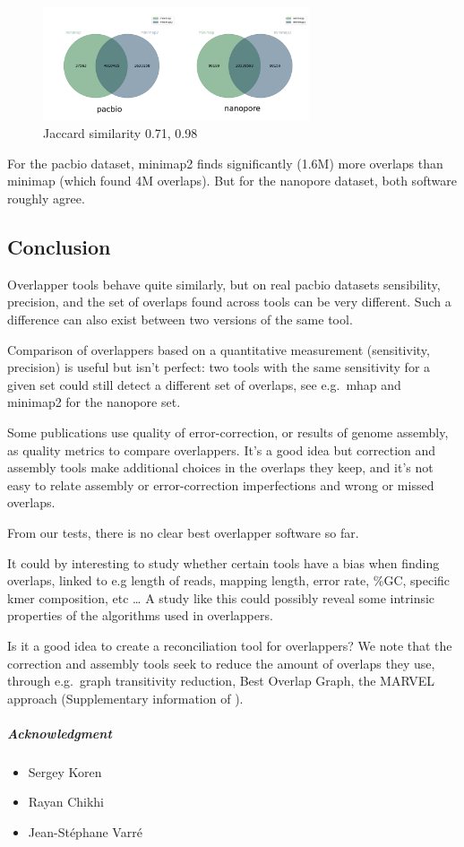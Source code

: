 \documentclass[./main.tex]{subfiles}
\begin{document}
\begin{figure}[ht]
\centering
\includegraphics[width=0.7\textwidth]{paper/blog_post/minimap_venn.png}
\caption{Jaccard similarity 0.71, 0.98}
\end{figure}


For the pacbio dataset, minimap2 finds significantly (1.6M) more
overlaps than minimap (which found 4M overlaps). But for the nanopore
dataset, both software roughly agree.

\subsection{Conclusion}\label{preassembly:ovl:conclusion}

Overlapper tools behave quite similarly, but on real pacbio
datasets sensibility, precision, and the set of overlaps found across tools can
be very different. Such a difference can also exist between two versions
of the same tool.

Comparison of overlappers based on a quantitative measurement
(sensitivity, precision) is useful but isn't perfect: two tools with the
same sensitivity for a given set could still detect a different set of
overlaps, see e.g.~mhap and minimap2 for the nanopore set.

Some publications use quality of error-correction, or results of genome
assembly, as quality metrics to compare overlappers. It's a good idea
but correction and assembly tools make additional choices in the
overlaps they keep, and it's not easy to relate assembly or
error-correction imperfections and wrong or missed overlaps.

From our tests, there is no clear best overlapper software so far.

It could by interesting to study whether certain tools have a bias when
finding overlaps, linked to e.g length of reads, mapping length, error
rate, \%GC, specific kmer composition, etc \ldots{} A study like this
could possibly reveal some intrinsic properties of the algorithms used
in overlappers.

Is it a good idea to create a reconciliation tool for overlappers? We
note that the correction and assembly tools seek to reduce the amount of
overlaps they use, through e.g.~graph transitivity reduction, Best
Overlap Graph, the MARVEL approach (Supplementary information of \cite{MARVEL}).

\subparagraph{Acknowledgment}\label{preassembly:ovl:acknowledgment}

\begin{itemize}
\item Sergey Koren
\item Rayan Chikhi
\item Jean-Stéphane Varré
\end{itemize}
\end{document}
